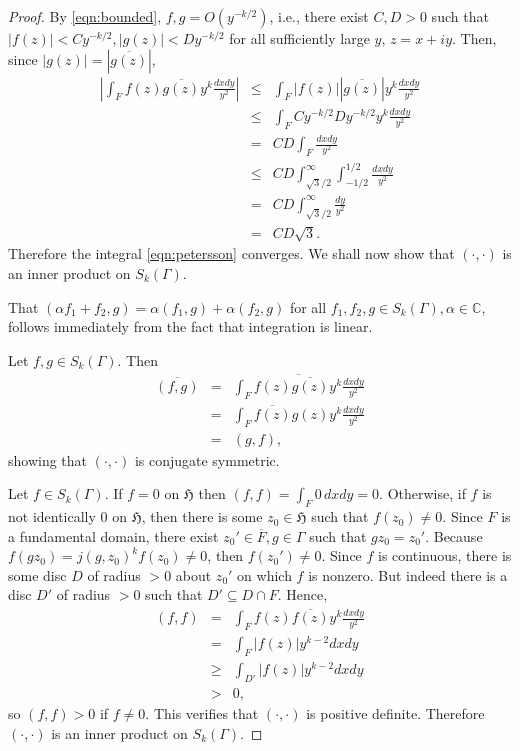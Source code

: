 \documentclass{article}
\begin{document}
\begin{proof}
By \eqref{eqn:bounded}, $f,g=O(y^{-k/2})$, i.e., there exist $C,D>0$ such that $|f(z)|<Cy^{-k/2}, |g(z)|<Dy^{-k/2}$ for
all sufficiently large $y$, $z=x+iy$. Then, since $|g(z)|=|\overline{g(z)}|$,
\begin{eqnarray*}
|\int_F f(z) \overline{g(z)} y^k \frac{dx dy}{y^2}|&\leq&\int_F |f(z)||\overline{g(z)}|y^k \frac{dx dy}{y^2}\\
&\leq&\int_F Cy^{-k/2} Dy^{-k/2} y^k \frac{dx dy}{y^2}\\
&=&CD\int_F \frac{dx dy}{y^2}\\
&\leq&CD\int_{\sqrt{3}/2}^\infty \int_{-1/2}^{1/2} \frac{dx dy}{y^2}\\
&=&CD\int_{\sqrt{3}/2}^\infty \frac{dy}{y^2}\\
&=&CD\sqrt{3}.
\end{eqnarray*}
Therefore the integral \eqref{eqn:petersson} converges. We shall now show that $(\cdot,\cdot)$ is an inner product on $S_k(\Gamma)$.

That $(\alpha f_1+ f_2,g)=\alpha(f_1,g)+\alpha(f_2,g)$ for all $f_1,f_2,g \in S_k(\Gamma), \alpha \in \mathbb{C}$, follows immediately from the fact that integration is linear.

Let $f,g \in S_k(\Gamma)$. Then
\begin{eqnarray*}
\overline{(f,g)}&=&\overline{\int_F f(z)\overline{g(z)}y^k \frac{dx dy}{y^2}}\\
&=&\int_F \overline{f(z)}g(z) y^k \frac{dx dy}{y^2}\\
&=&(g,f),
\end{eqnarray*}
showing that $(\cdot,\cdot)$ is conjugate symmetric.

Let $f \in S_k(\Gamma)$. If $f=0$ on $\mathfrak{H}$ then $(f,f)=\int_F 0\, dx dy=0$. Otherwise, if $f$ is not identically 0 on $\mathfrak{H}$, then there is some $z_0 \in \mathfrak{H}$ such that $f(z_0) \neq 0$. Since $F$ is a fundamental domain, there exist $z_0' \in \overline{F}, g\in \Gamma$ such that $gz_0=z_0'$. Because $f(gz_0)=j(g,z_0)^k f(z_0) \neq 0$, then $f(z_0') \neq 0$. Since $f$ is continuous, there is some disc $D$ of radius $>0$ about $z_0'$ on which $f$ is nonzero. But indeed there is a disc $D'$ of radius $>0$ such that $D' \subseteq D \cap F$. Hence,
\begin{eqnarray*}
(f,f)&=&\int_F f(z)\overline{f(z)}y^k \frac{dx dy}{y^2}\\
&=&\int_F |f(z)| y^{k-2} dx dy\\
&\geq&\int_{D'} |f(z)| y^{k-2} dx dy\\
&>&0,
\end{eqnarray*} 
so $(f,f)>0$ if $f \neq 0$. This verifies that $(\cdot,\cdot)$ is positive definite. Therefore $(\cdot,\cdot)$ is an inner product on $S_k(\Gamma)$.
\end{proof}



\end{document}
